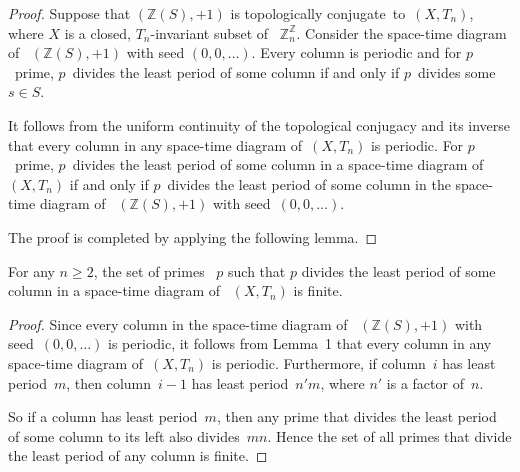 \documentclass[12pt]{amsart}
\begin{document}
\begin{proof}
Suppose that $({\mathbb Z}(S),+1)$ is {topologically conjugate}\ to~$ (X,T_n)$, where
$X$ is a closed, $T_n$-invariant
subset of ~${\mathbb Z}_n^{\mathbb Z}$.
Consider the space-time diagram of 
~$({\mathbb Z}(S),+1)$ with seed
$(0,0,\dots)$.  
Every column is periodic and
for $p$~prime,   
$p$~divides the least period of some column if and only if
$p$~divides some $s \in S$.

It follows from the uniform continuity of the topological conjugacy and its inverse that 
every column in any space-time diagram of~$(X,T_n)$ is periodic. 
For $p$~prime, $p$~divides the least period of some column in a space-time diagram of ~$(X,T_n)$ if and only if
 $p$~divides the least period of some column in the space-time diagram of
~$({\mathbb Z}(S),+1)$ with seed~$(0,0,\dots)$.

The proof is completed by applying the following lemma.
\end{proof}

\begin{lemma}
For any $n \ge 2$,
the set of primes ~$p$  such that $p$ divides the least period of some column in a space-time diagram of
~$(X,T_n)$ is finite.
\end{lemma}

\begin{proof}
Since every column in the space-time diagram of 
~$({\mathbb Z}(S),+1)$ with seed~$(0,0,\dots)$
is periodic, it follows from 
Lemma~1  that every column in any space-time diagram of~$(X,T_n)$ is periodic.
Furthermore, if column~$i$ has least period~$m$, then column~$i-1$ has least period~$n'm$, where $n'$ is a factor of~$n$.

So if a column has least period~$m$, then
any prime that divides the least period of some column to its left also divides~$mn$. Hence the set of all primes that divide the least period of any column is finite.
\end{proof}
\end{document}
